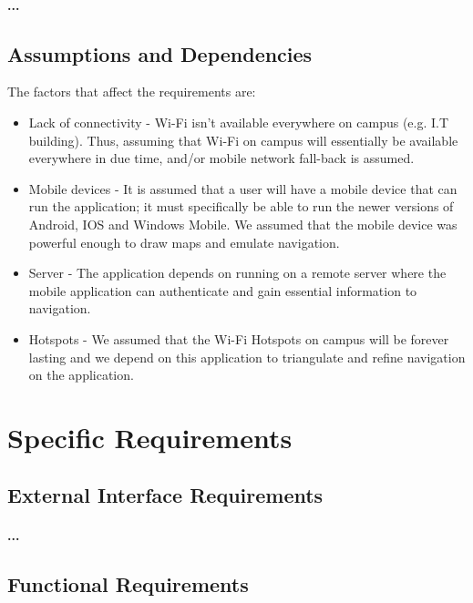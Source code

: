 \documentclass[runningheads,a4paper]{article}
\begin{document}
\paragraph{...}

 
\subsection{Assumptions and Dependencies}
The factors that affect the requirements are:
\begin{itemize}
	 
		\item Lack of connectivity -  Wi-Fi isn't available everywhere on campus (e.g. I.T building). Thus, assuming that Wi-Fi on campus will essentially be available everywhere in due time, and/or mobile network fall-back is assumed.
		
		\item Mobile devices - It is assumed that a user will have a mobile device that can run the application; it must specifically be able to run the newer versions of Android, IOS and Windows Mobile. We assumed that the mobile device was powerful enough to draw maps and emulate navigation.
		\item Server - The application depends on running on a remote server where the mobile application can authenticate and gain essential information to navigation.
		
		\item Hotspots - We assumed that the Wi-Fi Hotspots on campus will be forever lasting and we depend on this application to triangulate and refine navigation on the application.
	 
\end{itemize}
 


\section{Specific Requirements}

\subsection{External Interface Requirements}
\paragraph{...}
\subsection{Functional Requirements}
\end{document}

